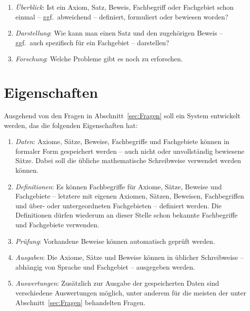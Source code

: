 \documentclass[english,ngerman,parskip=half,headsepline,footsepline]{scrreprt}
\makeatletter
\newcommand*{\texthead}[1]{\textnormal{\textsf{\textbf{#1}}}}%
\newcommand{\Lohead}[1]{\lohead{\texthead{#1}}}
\newcommand{\Cohead}[1]{\cohead{\texthead{#1}}}
\newcommand{\Thispagestyle}{\thispagestyle{scrheadings}}
\newcommand*{\Sectionname}{\sectionname}%
\newcommand*{\nextsection}{%
}
\newcommand*{\newsection}[1]{%
	\markright{#1}
	\Cohead{\rightmark}
	\Lohead{\Sectionname~\thesection}
	\Thispagestyle%
}
\newcounter{Enumi}%
\newcommand*{\sectionname}{Abschnitt}
\newcommand*{\textggf}{ggf.\@}
\makeatother
\begin{document}
\begin{enumerate}
		\item \label{Frage:Überblick} \emph{Überblick}: Ist ein Axiom, Satz, Beweis, Fachbegriff oder Fachgebiet schon einmal -- \textggf\ abweichend -- definiert, formuliert oder bewiesen worden?

		\item \label{Frage:Darstellung} \emph{Darstellung}: Wie kann man einen Satz und den zugehörigen Beweis -- \textggf\ auch spezifisch für ein Fachgebiet -- darstellen?

		\item \label{Frage:Forschung} \emph{Forschung}: Welche Probleme gibt es noch zu erforschen.

	\end{enumerate}

	\nextsection
	\section{Eigenschaften}%
	\newsection{Eigenschaften}
	\label{sec:Eigenschaften}

	Ausgehend von den Fragen in \sectionname~\vref{sec:Fragen} soll ein System entwickelt werden, das die folgenden Eigenschaften hat:

	\begin{enumerate}

		\item \label{Eigenschaft:Daten} \emph{Daten}: Axiome, Sätze, Beweise, Fachbegriffe und Fachgebiete können in formaler Form gespeichert werden -- auch nicht oder unvollständig bewiesene Sätze.
		Dabei soll die übliche mathematische Schreibweise verwendet werden können.

		\item \label{Eigenschaft:Definitionen} \emph{Definitionen}: Es können Fachbegriffe für Axiome, Sätze, Beweise und Fachgebiete -- letztere mit eigenen Axiomen, Sätzen, Beweisen, Fachbegriffen und über- oder untergeordneten Fachgebieten -- definiert werden.
		Die Definitionen dürfen wiederum an dieser Stelle schon bekannte Fachbegriffe und Fachgebiete verwenden.

		\item \label{Eigenschaft:Prüfung} \emph{Prüfung}: Vorhandene Beweise können automatisch geprüft werden.

		\item \label{Eigenschaft:Ausgaben} \emph{Ausgaben}: Die Axiome, Sätze und Beweise können in üblicher Schreibweise -- abhängig von Sprache und Fachgebiet -- ausgegeben werden.

		\item \label{Eigenschaft:Auswertungen} \emph{Auswertungen}: Zusätzlich zur Ausgabe der gespeicherten Daten sind verschiedene Auswertungen möglich, unter anderem für die meisten der unter \sectionname~\vref{sec:Fragen} behandelten Fragen.

		\setcounter{Enumi}{\value{enumi}}%
	\end{enumerate}
\end{document}
